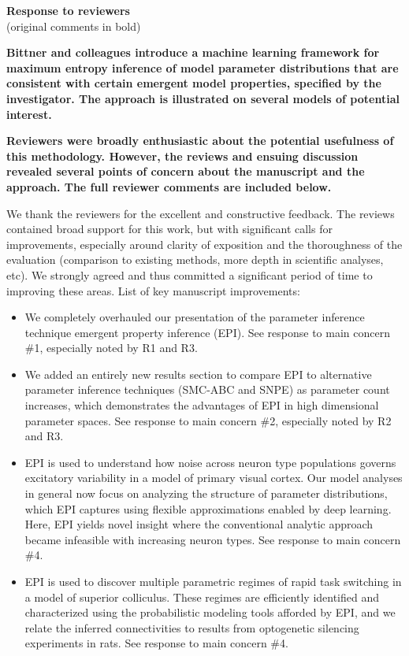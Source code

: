 \documentclass[11pt,a4paper]{article}
\begin{document}
 

{\Large \textbf{Response to reviewers}} \\
(original comments in bold)

\textbf{Bittner and colleagues introduce a machine learning framework for maximum entropy inference of model parameter distributions that are consistent with certain emergent model properties, specified by the investigator. The approach is illustrated on several models of potential interest.} 

\textbf{Reviewers were broadly enthusiastic about the potential usefulness of this methodology. However, the reviews and ensuing discussion revealed several points of concern about the manuscript and the approach. The full reviewer comments are included below.} 

We thank the reviewers for the excellent and constructive feedback.  The reviews contained broad support for this work, but with significant calls for improvements, especially around clarity of exposition and the thoroughness of the evaluation (comparison to existing methods, more depth in scientific analyses, etc).  We strongly agreed and thus committed a significant period of time to improving these areas.  List of key manuscript improvements:
\begin{itemize}
\item We completely overhauled our presentation of the parameter inference technique emergent property inference (EPI). See response to main concern \#1, especially noted by R1 and R3.
\item We added an entirely new results section to compare EPI to alternative parameter inference techniques (SMC-ABC and SNPE) as parameter count increases, which demonstrates the advantages of EPI in high dimensional parameter spaces. See response to main concern \#2, especially noted by R2 and R3.
\item EPI is used to understand how noise across neuron type populations governs excitatory variability in a model of primary visual cortex.  Our model analyses in general now focus on analyzing the structure of parameter distributions, which EPI captures using flexible approximations enabled by deep learning.  
Here, EPI yields novel insight where the conventional analytic approach became infeasible with increasing neuron types.  See response to main concern \#4.
\item EPI is used to discover multiple parametric regimes of rapid task switching in a model of superior colliculus.  
These regimes are efficiently identified and characterized using the probabilistic modeling tools afforded by EPI, and we relate the inferred connectivities to results from optogenetic silencing experiments in rats. See response to main concern \#4.
\end{itemize}
\end{document}
